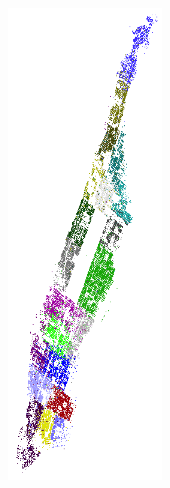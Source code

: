 \documentclass[12pt]{beamer}
\begin{document}
\begin{frame}[t]
\begin{columns}
\vspace{-1.3cm}
\begin{center}
\includegraphics[width=0.6\textwidth]{imgs/police.png}
\end{center}

\end{columns}

\end{frame}
\end{document}

